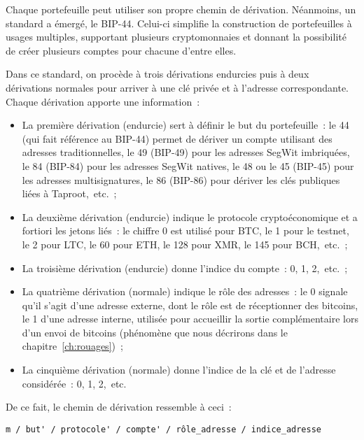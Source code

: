 Chaque portefeuille peut utiliser son propre chemin de dérivation. Néanmoins, un standard a émergé, le BIP-44. Celui-ci simplifie la construction de portefeuilles à usages multiples, supportant plusieurs cryptomonnaies et donnant la possibilité de créer plusieurs comptes pour chacune d'entre elles.

Dans ce standard, on procède à trois dérivations endurcies puis à deux dérivations normales pour arriver à une clé privée et à l'adresse correspondante. Chaque dérivation apporte une information~:

\begin{itemize}
  \item La première dérivation (endurcie) sert à définir le but du portefeuille~: le 44 (qui fait référence au BIP-44) permet de dériver un compte utilisant des adresses traditionnelles, le 49 (BIP-49) pour les adresses SegWit imbriquées, le 84 (BIP-84) pour les adresses SegWit natives, le 48 ou le 45 (BIP-45) pour les adresses multisignatures, le 86 (BIP-86) pour dériver les clés publiques liées à Taproot,~etc.~;
  \item La deuxième dérivation (endurcie) indique le protocole cryptoéconomique et a fortiori les jetons liés~: le chiffre 0 est utilisé pour BTC, le 1 pour le testnet, le 2 pour LTC, le 60 pour ETH, le 128 pour XMR, le 145 pour BCH,~etc.~;
  \item La troisième dérivation (endurcie) donne l'indice du compte~: 0, 1, 2,~etc.~;
  \item La quatrième dérivation (normale) indique le rôle des adresses~: le 0 signale qu'il s'agit d'une adresse externe, dont le rôle est de réceptionner des bitcoins, le 1 d'une adresse interne, utilisée pour accueillir la sortie complémentaire lors d'un envoi de bitcoins (phénomène que nous décrirons dans le chapitre~\ref{ch:rouages})~;
  \item La cinquième dérivation (normale) donne l'indice de la clé et de l'adresse considérée~: 0, 1, 2,~etc.
\end{itemize}

De ce fait, le chemin de dérivation ressemble à ceci~:

\begin{Verbatim}[fontsize=\footnotesize]
m / but' / protocole' / compte' / rôle_adresse / indice_adresse
\end{Verbatim}

